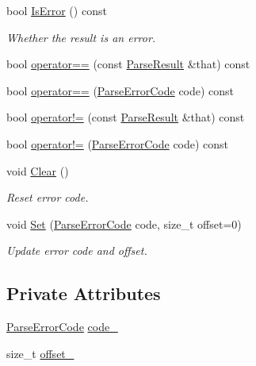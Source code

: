 \begin{DoxyCompactItemize}
bool \mbox{\hyperlink{structrapidjson_1_1_parse_result_ab6d87c6ce9c849f35e902fbe23f485c4}{Is\+Error}} () const
\begin{DoxyCompactList}\small\item\em Whether the result is an error. \end{DoxyCompactList}\item 
bool \mbox{\hyperlink{structrapidjson_1_1_parse_result_a53e838c5114c4770b01ba5fb4fe2ec09}{operator==}} (const \mbox{\hyperlink{structrapidjson_1_1_parse_result}{Parse\+Result}} \&that) const
\item 
bool \mbox{\hyperlink{structrapidjson_1_1_parse_result_a512e065514f0c55c539ef70033a3f508}{operator==}} (\mbox{\hyperlink{group___r_a_p_i_d_j_s_o_n___e_r_r_o_r_s_ga7d3acf640886b1f2552dc8c4cd6dea60}{Parse\+Error\+Code}} code) const
\item 
bool \mbox{\hyperlink{structrapidjson_1_1_parse_result_ac58540d291311724829cac7ead1bae79}{operator!=}} (const \mbox{\hyperlink{structrapidjson_1_1_parse_result}{Parse\+Result}} \&that) const
\item 
bool \mbox{\hyperlink{structrapidjson_1_1_parse_result_a82fc3c16d5b670e8a86630c4feb730c1}{operator!=}} (\mbox{\hyperlink{group___r_a_p_i_d_j_s_o_n___e_r_r_o_r_s_ga7d3acf640886b1f2552dc8c4cd6dea60}{Parse\+Error\+Code}} code) const
\item 
void \mbox{\hyperlink{structrapidjson_1_1_parse_result_a17c9f7f81675283393222658d613000f}{Clear}} ()
\begin{DoxyCompactList}\small\item\em Reset error code. \end{DoxyCompactList}\item 
void \mbox{\hyperlink{structrapidjson_1_1_parse_result_a40c0bd4d6c535c57acbb5c2e656bea38}{Set}} (\mbox{\hyperlink{group___r_a_p_i_d_j_s_o_n___e_r_r_o_r_s_ga7d3acf640886b1f2552dc8c4cd6dea60}{Parse\+Error\+Code}} code, size\+\_\+t offset=0)
\begin{DoxyCompactList}\small\item\em Update error code and offset. \end{DoxyCompactList}\end{DoxyCompactItemize}
\subsection*{Private Attributes}
\begin{DoxyCompactItemize}
\item 
\mbox{\hyperlink{group___r_a_p_i_d_j_s_o_n___e_r_r_o_r_s_ga7d3acf640886b1f2552dc8c4cd6dea60}{Parse\+Error\+Code}} \mbox{\hyperlink{structrapidjson_1_1_parse_result_aa8a4a0331c0b50ce9f28be8449cb91e1}{code\+\_\+}}
\item 
size\+\_\+t \mbox{\hyperlink{structrapidjson_1_1_parse_result_a5af9e6aa0412019ac0820dcd2eac8c10}{offset\+\_\+}}
\end{DoxyCompactItemize}
